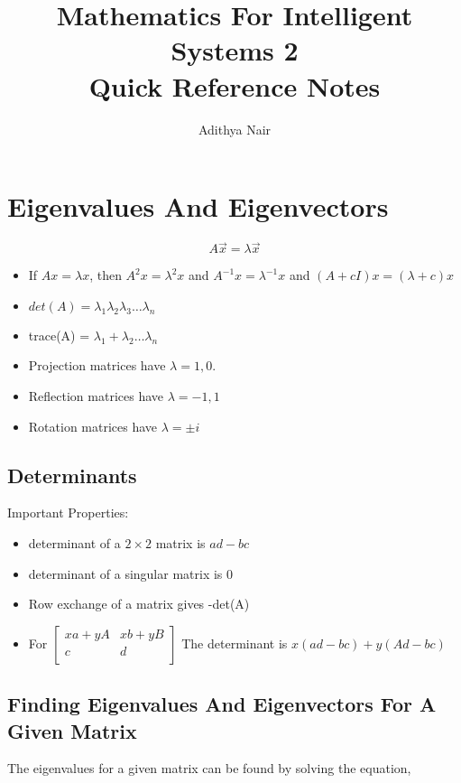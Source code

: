 \documentclass{report}
\title{Mathematics For Intelligent Systems 2 \\ Quick Reference Notes}
\author{Adithya Nair}
\begin{document}
\maketitle
\chapter{Eigenvalues And Eigenvectors}



\textbf{\[
   A\vec{x} = \lambda \vec{x}
\]}

\begin{note}
	\begin{itemize}
	\item If $Ax = \lambda x$, then $A^2 x = \lambda^2 x$ and $A^{-1}x = \lambda^{-1}x$ and $(A+cI)x = (\lambda + c)x$ 
	\item $det(A) = \lambda_1 \lambda_2 \lambda_3 \dots \lambda_n$
	\item trace(A) = $\lambda_1 + \lambda_2 \dots \lambda_n$
	\item Projection matrices have $\lambda = 1,0$. 
	\item Reflection matrices have $\lambda = -1,1$
	\item Rotation matrices have $\lambda = \pm i$
	\end{itemize}
\end{note}
\section{Determinants}
Important Properties: 
\begin{note}
   \begin{itemize}
   	\item determinant of a $2 \times 2$ matrix is $ad - bc$
	\item determinant of a singular matrix is 0 
	\item Row exchange of a matrix gives -det(A)
	\item For $\begin{bmatrix}
	      xa + yA & xb + yB \\
	      c & d \\
	\end{bmatrix}$
	The determinant is $x(ad - bc) + y(Ad-bc)$
   \end{itemize}	
\end{note}
\section{Finding Eigenvalues And Eigenvectors For A Given Matrix}
The eigenvalues for a given matrix can be found by solving the equation,
\end{document}
